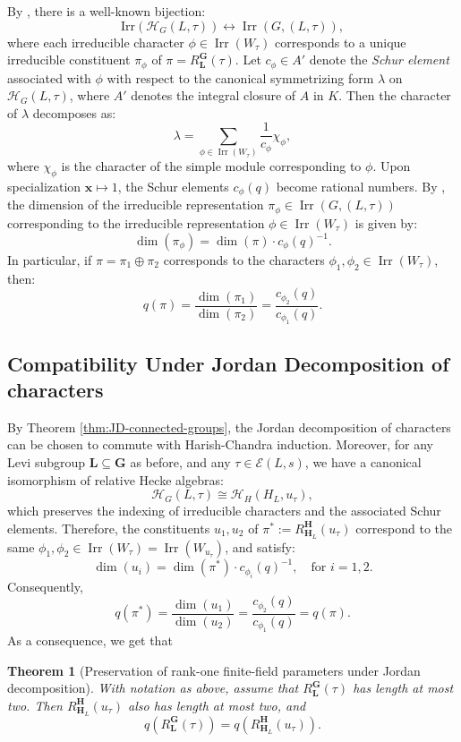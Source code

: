 \documentclass{amsart}
\theoremstyle{plain}
\numberwithin{equation}{section}
\newtheorem{theorem}{Theorem}[section]
\theoremstyle{definition}
\renewcommand{\dim}{\operatorname{dim}}
\newcommand{\cE}{\mathcal{E}}
\newcommand{\Irr}{\operatorname{Irr}}
\newcommand{\bG}{\mathbf{G}}
\newcommand{\bL}{\mathbf{L}}
\newcommand{\bH}{\mathbf{H}}
\begin{document}
By \cite[Theorem~3.2.5]{Book:GeckandMalle}, there is a well-known bijection:
\[
\mathrm{Irr}(\mathcal{H}_G(L, \tau)) \longleftrightarrow \Irr(G, (L, \tau)),
\]
where each irreducible character $\phi \in \Irr(W_{\tau})$ corresponds to a unique irreducible constituent $\pi_\phi$ of $\pi = R_{\bL}^{\bG}(\tau)$.
Let $c_\phi \in A'$ denote the \textit{Schur element} associated with $\phi$ with respect to the canonical symmetrizing form $\lambda$ on $\mathcal{H}_G(L, \tau)$, where $A'$ denotes the integral closure of $A$ in $K$. Then the character of $\lambda$ decomposes as:
\[
\lambda = \sum_{\phi \in \Irr(W_{\tau})} \frac{1}{c_\phi} \chi_\phi,
\]
where $\chi_\phi$ is the character of the simple module corresponding to $\phi$.
Upon specialization $\mathbf{x} \mapsto 1$, the Schur elements $c_\phi(q)$ become rational numbers.
By \cite[Theorem~3.2.18]{Book:GeckandMalle}, the dimension of the irreducible representation $\pi_{\phi}\in \Irr(G,(L,\tau))$ corresponding to the irreducible representation $\phi\in\Irr(W_{\tau})$ is given by:
\[
\dim(\pi_\phi) = \dim(\pi) \cdot c_\phi(q)^{-1}.
\]
In particular, if $\pi = \pi_1 \oplus \pi_2$ corresponds to the characters $\phi_1, \phi_2 \in \Irr(W_{\tau})$, then:
\[
q(\pi)= \frac{\dim(\pi_1)}{\dim(\pi_2)} = \frac{c_{\phi_2}(q)}{c_{\phi_1}(q)}.
\]

\subsection{Compatibility Under Jordan Decomposition of characters}

By Theorem \ref{thm:JD-connected-groups}, the Jordan decomposition of characters can be chosen to commute with Harish-Chandra induction.
Moreover, for any Levi subgroup $\bL \subseteq \bG$ as before, and any $\tau \in \cE(L, s)$, we have a canonical isomorphism of relative Hecke algebras:
\[
\mathcal{H}_G(L, \tau) \cong \mathcal{H}_{H}(H_L, u_{\tau}),
\]
which preserves the indexing of irreducible characters and the associated Schur elements.
Therefore, the constituents $u_1, u_2$ of $\pi^* := R_{\bH_L}^{\bH}(u_{\tau})$ correspond to the same $\phi_1, \phi_2 \in \Irr(W_{\tau})=\Irr(W_{u_\tau})$, and satisfy:
\[
\dim(u_i) = \dim(\pi^*) \cdot c_{\phi_i}(q)^{-1}, \quad \text{for } i = 1, 2.
\]
Consequently,
\[
q(\pi^*) = \frac{\dim(u_1)}{\dim(u_2)} = \frac{c_{\phi_2}(q)}{c_{\phi_1}(q)} = q(\pi).
\]
As a consequence, we get that
\begin{theorem}[Preservation of rank-one finite-field parameters under Jordan decomposition]
\label{thm:finite-JD-preserves-q-parameter}
With notation as above, assume that \(R_{\bL}^{\bG}(\tau)\) has length at most two.
Then \(R_{\bH_L}^{\bH}(u_\tau)\) also has length at most two, and
\[
q\left( R_{\bL}^{\bG}(\tau) \right)
=
q\left( R_{\bH_L}^{\bH}(u_{\tau}) \right).
\]
\end{theorem}
\end{document}
